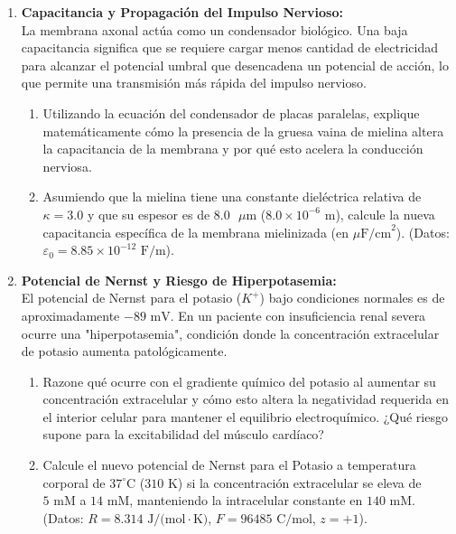 \documentclass[11pt,letterpaper]{article}
\begin{document}
\begin{enumerate}[leftmargin=*]
    \vspace{0.2cm}

    \item \textbf{Capacitancia y Propagación del Impulso Nervioso:}\\
    La membrana axonal actúa como un condensador biológico. Una baja capacitancia significa que se requiere cargar menos cantidad de electricidad para alcanzar el potencial umbral que desencadena un potencial de acción, lo que permite una transmisión más rápida del impulso nervioso.
    \begin{enumerate}
        \item Utilizando la ecuación del condensador de placas paralelas, explique matemáticamente cómo la presencia de la gruesa vaina de mielina altera la capacitancia de la membrana y por qué esto acelera la conducción nerviosa.
        \item Asumiendo que la mielina tiene una constante dieléctrica relativa de $\kappa = 3.0$ y que su espesor es de $8.0 \text{ }\mu\text{m}$ ($8.0 \times 10^{-6} \text{ m}$), calcule la nueva capacitancia específica de la membrana mielinizada (en $\mu\text{F/cm}^2$). (Datos: $\varepsilon_0 = 8.85 \times 10^{-12} \text{ F/m}$).
    \end{enumerate}

    \vspace{0.2cm}

    \item \textbf{Potencial de Nernst y Riesgo de Hiperpotasemia:}\\
    El potencial de Nernst para el potasio ($K^+$) bajo condiciones normales es de aproximadamente $-89 \text{ mV}$. En un paciente con insuficiencia renal severa ocurre una "hiperpotasemia", condición donde la concentración extracelular de potasio aumenta patológicamente.
    \begin{enumerate}
        \item Razone qué ocurre con el gradiente químico del potasio al aumentar su concentración extracelular y cómo esto altera la negatividad requerida en el interior celular para mantener el equilibrio electroquímico. ¿Qué riesgo supone para la excitabilidad del músculo cardíaco?
        \item Calcule el nuevo potencial de Nernst para el Potasio a temperatura corporal de $37^\circ\text{C}$ ($310 \text{ K}$) si la concentración extracelular se eleva de $5 \text{ mM}$ a $14 \text{ mM}$, manteniendo la intracelular constante en $140 \text{ mM}$. (Datos: $R = 8.314 \text{ J/(mol}\cdot\text{K)}$, $F = 96485 \text{ C/mol}$, $z = +1$).
    \end{enumerate}


\end{enumerate}
\end{document}
